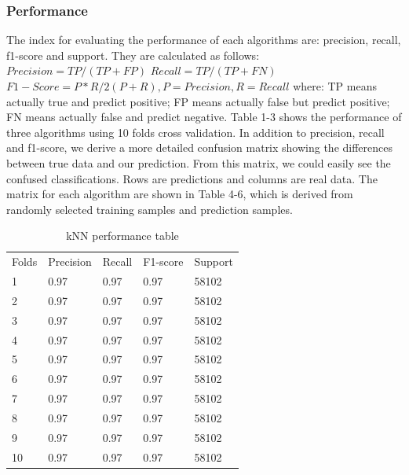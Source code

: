 \documentclass[12pt]{report}
\begin{document}
\subsubsection*{Performance}
The index for evaluating the performance of each algorithms are: precision, recall, f1-score and support. They are calculated as follows:
\newline $Precision = TP / (TP + FP)$
\newline $Recall = TP / (TP + FN)$
\newline $F1-Score = P*R/2(P+R), P=Precision, R=Recall$
\newline where: TP means actually true and predict positive; FP means actually false but predict positive; FN means actually false and predict negative.
\newline Table 1-3 shows the performance of three algorithms using 10 folds cross validation.
\newline
\newline In addition to precision, recall and f1-score, we derive a more detailed confusion matrix showing the differences between true data and our prediction. From this matrix, we could easily see the confused classifications. Rows are predictions and columns are real data. The matrix for each algorithm are shown in Table 4-6, which is derived from randomly selected training samples and prediction samples.
\begin{table}
\centering
\caption{kNN performance table}
\label{my-label}
\begin{tabular}{lllll}
 Folds&  Precision&  Recall&  F1-score& Support \\
 1&  0.97&  0.97&  0.97& 58102 \\
 2& 0.97 &  0.97&  0.97&  58102\\
 3&  0.97&  0.97&  0.97& 58102\\
 4& 0.97&  0.97&  0.97& 58102\\
 5& 0.97&  0.97&  0.97& 58102\\
 6& 0.97&  0.97&  0.97& 58102\\
 7& 0.97&  0.97&  0.97& 58102\\
 8& 0.97&  0.97&  0.97& 58102\\
 9& 0.97&  0.97&  0.97& 58102\\
 10& 0.97&  0.97&  0.97& 58102\\
\end{tabular}
\end{table}
\end{document}
